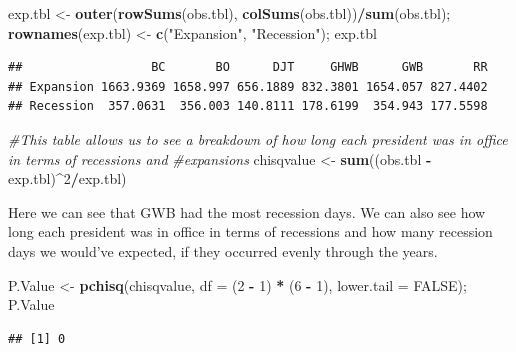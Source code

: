 \documentclass[]{article}
\newenvironment{Shaded}{\begin{snugshade}}{\end{snugshade}}
\newcommand{\CommentTok}[1]{\textcolor[rgb]{0.56,0.35,0.01}{\textit{#1}}}
\newcommand{\DataTypeTok}[1]{\textcolor[rgb]{0.13,0.29,0.53}{#1}}
\newcommand{\DecValTok}[1]{\textcolor[rgb]{0.00,0.00,0.81}{#1}}
\newcommand{\KeywordTok}[1]{\textcolor[rgb]{0.13,0.29,0.53}{\textbf{#1}}}
\newcommand{\NormalTok}[1]{#1}
\newcommand{\OperatorTok}[1]{\textcolor[rgb]{0.81,0.36,0.00}{\textbf{#1}}}
\newcommand{\OtherTok}[1]{\textcolor[rgb]{0.56,0.35,0.01}{#1}}
\newcommand{\StringTok}[1]{\textcolor[rgb]{0.31,0.60,0.02}{#1}}
\begin{document}
\begin{Shaded}
\begin{Highlighting}[]
\NormalTok{exp.tbl <-}\StringTok{ }\KeywordTok{outer}\NormalTok{(}\KeywordTok{rowSums}\NormalTok{(obs.tbl), }\KeywordTok{colSums}\NormalTok{(obs.tbl))}\OperatorTok{/}\KeywordTok{sum}\NormalTok{(obs.tbl); }\KeywordTok{rownames}\NormalTok{(exp.tbl) <-}\StringTok{ }\KeywordTok{c}\NormalTok{(}\StringTok{"Expansion"}\NormalTok{, }\StringTok{"Recession"}\NormalTok{); exp.tbl}
\end{Highlighting}
\end{Shaded}

\begin{verbatim}
##                  BC       BO      DJT     GHWB      GWB       RR
## Expansion 1663.9369 1658.997 656.1889 832.3801 1654.057 827.4402
## Recession  357.0631  356.003 140.8111 178.6199  354.943 177.5598
\end{verbatim}

\begin{Shaded}
\begin{Highlighting}[]
\CommentTok{#This table allows us to see a breakdown of how long each president was in office in terms of recessions and }
\CommentTok{#expansions}
\NormalTok{chisqvalue <-}\StringTok{ }\KeywordTok{sum}\NormalTok{((obs.tbl }\OperatorTok{-}\StringTok{ }\NormalTok{exp.tbl)}\OperatorTok{^}\DecValTok{2}\OperatorTok{/}\NormalTok{exp.tbl)}
\end{Highlighting}
\end{Shaded}

Here we can see that GWB had the most recession days. We can also see
how long each president was in office in terms of recessions and how
many recession days we would've expected, if they occurred evenly
through the years.

\begin{Shaded}
\begin{Highlighting}[]
\NormalTok{P.Value <-}\StringTok{ }\KeywordTok{pchisq}\NormalTok{(chisqvalue, }\DataTypeTok{df =}\NormalTok{ (}\DecValTok{2} \OperatorTok{-}\StringTok{ }\DecValTok{1}\NormalTok{) }\OperatorTok{*}\StringTok{ }\NormalTok{(}\DecValTok{6} \OperatorTok{-}\StringTok{ }\DecValTok{1}\NormalTok{), }\DataTypeTok{lower.tail =} \OtherTok{FALSE}\NormalTok{); P.Value}
\end{Highlighting}
\end{Shaded}

\begin{verbatim}
## [1] 0
\end{verbatim}
\end{document}
